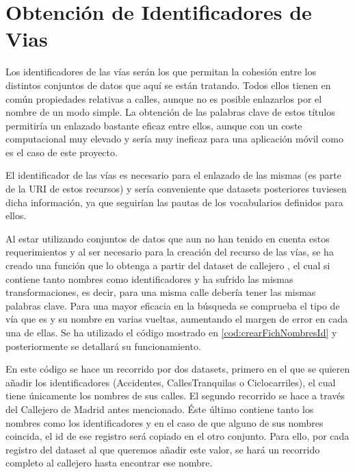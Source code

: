 \section{Obtención de Identificadores de Vias}

Los identificadores de las vías serán los que permitan la cohesión entre los distintos conjuntos de datos que aquí se están tratando. Todos ellos tienen en común propiedades relativas a calles, aunque no es posible enlazarlos por el nombre de un modo simple.
La obtención de las palabras clave de estos títulos permitiría un enlazado bastante eficaz entre ellos, aunque con un coste computacional muy elevado y sería muy ineficaz para una aplicación móvil como es el caso de este proyecto.

El identificador de las vías es necesario para el enlazado de las mismas (es parte de la URI de estos recursos) y sería conveniente que datasets posteriores tuviesen dicha información, ya que seguirían las pautas de los vocabularios definidos para ellos.

Al estar utilizando conjuntos de datos que aun no han tenido en cuenta estos requerimientos y al ser necesario para la creación del recurso de las vías, se ha creado una función que lo obtenga a partir del dataset de callejero \cite{datosmadrid_callejero}, el cual si contiene tanto nombres como identificadores y ha sufrido las mismas transformaciones, es decir, para una misma calle debería tener las mismas palabras clave. Para una mayor eficacia en la búsqueda se comprueba el tipo de vía que es y su nombre en varias vueltas, aumentando el margen de error en cada una de ellas.
Se ha utilizado el código mostrado en \ref{cod:crearFichNombresId} y posteriormente se detallará su funcionamiento.



En este código se hace un recorrido por dos datasets, primero en el que se quieren añadir los identificadores (Accidentes, CallesTranquilas o Ciclocarriles), el cual tiene únicamente los nombres de sus calles. El segundo recorrido se hace a través del Callejero de Madrid antes mencionado. Éste último contiene tanto los nombres como los identificadores y en el caso de que alguno de sus nombres coincida, el id de ese registro será copiado en el otro conjunto. Para ello, por cada registro del dataset al que queremos añadir este valor, se hará un recorrido completo al callejero hasta encontrar ese nombre.

